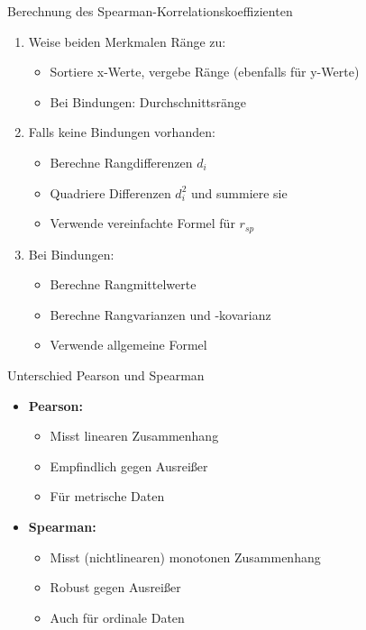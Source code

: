 \begin{KR}{Berechnung des Spearman-Korrelationskoeffizienten}
\begin{enumerate}
    \item Weise beiden Merkmalen Ränge zu:
        \begin{itemize}
            \item Sortiere x-Werte, vergebe Ränge (ebenfalls für y-Werte)
            \item Bei Bindungen: Durchschnittsränge
        \end{itemize}
    \item Falls keine Bindungen vorhanden:
        \begin{itemize}
            \item Berechne Rangdifferenzen $d_i$
            \item Quadriere Differenzen $d_i^2$ und summiere sie
            \item Verwende vereinfachte Formel für $r_{sp}$
        \end{itemize}
    \item Bei Bindungen:
        \begin{itemize}
            \item Berechne Rangmittelwerte
            \item Berechne Rangvarianzen und -kovarianz
            \item Verwende allgemeine Formel
        \end{itemize}
\end{enumerate}
\end{KR}

\begin{concept}{Unterschied Pearson und Spearman}
\begin{itemize}
    \item \textbf{Pearson:}
    \begin{itemize}
        \item Misst linearen Zusammenhang
        \item Empfindlich gegen Ausreißer
        \item Für metrische Daten
    \end{itemize}
    \item \textbf{Spearman:}
    \begin{itemize}
        \item Misst (nichtlinearen) monotonen Zusammenhang
        \item Robust gegen Ausreißer
        \item Auch für ordinale Daten
    \end{itemize}
\end{itemize}
\end{concept}

